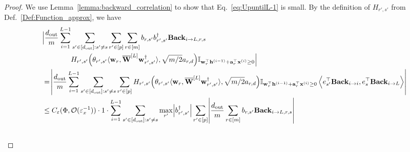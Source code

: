 \begin{proof}
			We use Lemma~\ref{lemma:backward_correlation} to show that Eq.~\ref{eq:UpuntilL-1} is small. By the definition of $H_{r',s'}$ from Def.~\ref{Def:Function_approx}, we have
			\begingroup \allowdisplaybreaks
			\begin{align*}
				&\Big|\frac{\dout }{m} \sum_{i=1}^{L-1}  \sum_{s' \in [\dout ]: s' \ne s} \sum_{r' \in [p]} \sum_{r \in [m]}  b_{r, s'} b_{r', s'}^{\dagger} \mathbf{Back}_{i \to L, r, s} \\& \quad \quad \quad \quad H_{r', s'}\Big(\theta_{r', s'} \langle \mathbf{w}_{r}, \overline{\mathbf{W}}^{[L]} \mathbf{w}_{r', s'}^{\dagger}\rangle , \sqrt{m/2} a_{r, d}\Big) \mathbb{I}_{\mathbf{w}_r^{\top} \mathbf{h}^{(i-1)} + \mathbf{a}_r^{\top} \mathbf{x}^{(i)} \ge 0}\Big| 
				\\& = \abs{\frac{\dout }{m} \sum_{i=1}^{L-1} \sum_{s' \in [\dout ]: s' \ne s} \sum_{r' \in [p]} H_{r', s'}\Big(\theta_{r', s'} \langle \mathbf{w}_{r}, \overline{\mathbf{W}}^{[L]} \mathbf{w}_{r', s'}^{\dagger}\rangle , \sqrt{m/2} a_{r, d}\Big) \mathbb{I}_{\mathbf{w}_r^{\top} \mathbf{h}^{(i-1)} + \mathbf{a}_r^{\top} \mathbf{x}^{(i)} \ge 0} \left\langle e_{s'}^{\top} \mathbf{Back}_{i \to i}, e_s^{\top} \mathbf{Back}_{i \to L}\right\rangle}
				\\&
				\le C_\varepsilon(\Phi, \mathcal{O}( \varepsilon_x^{-1})) \cdot 1 \cdot \sum_{i=1}^{L-1}  \sum_{s' \in [\dout ]: s' \ne s} \max_{r'}  \abs{b_{r', s'}^{\dagger}}  \sum_{r' \in [p]}  \abs{\frac{\dout }{m}  \sum_{r \in [m]}  b_{r, s'}  \mathbf{Back}_{i \to L, r, s}} \\&

\end{align*}
\end{proof}
